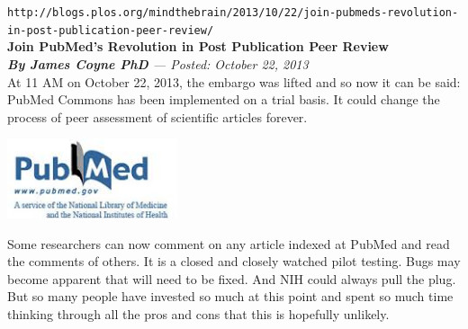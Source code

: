 \documentclass[11pt,twoside,a4paper]{article}
\def\maketitle{%
	\begin{center}
		\begin{tabular}[c]{c|c}
			\textsc{\textbf{Institution}}~\\[\baselineskip]~\\[\baselineskip]
			\emph{\textbf{Date 09-09-2009}}~\\[\baselineskip]~\\[\baselineskip]
			\emph{\textbf{Pr{\'e}cisions relatives au contexte}}~\\[\baselineskip]~\\[\baselineskip]
			\textsc{Auteur inestimable}~\\[\baselineskip]~\\[\baselineskip]
			& 
			\texttt{[image: img/logo\_glider.png]}~\\[\baselineskip]
		\end{tabular}
			~\\[\baselineskip]~\\[\baselineskip]
			\Huge{Titre principal}~\\[\baselineskip]
			\Large{Titre secondaire}~\\[\baselineskip]
		
		~\\[\baselineskip]
		~\\[\baselineskip]
	\large{
		\textsc{\textbf{Institution d'accueil et jury}}
		~\\[\baselineskip]
		<<titre personne>> : \texttt{Anne ONYME}~\\[\baselineskip]
		<<titre personne>> : \texttt{Jocelyn CONNU}~\\[\baselineskip]
		~\\[\baselineskip]
		\textit{Pr{\'e}cisions du contexte de r{\'e}daction de l'article}
	}

	\end{center}

}%
\begin{document}

\setcounter{page}{1}

\setlength\parindent{0pt}

\texttt{http://blogs.plos.org/mindthebrain/2013/10/22/join-pubmeds-revolution-in-post-publication-peer-review/} ~\\

\textbf{\Large Join PubMed's Revolution in Post Publication Peer Review} ~\\

\emph{\textbf{By James Coyne PhD} --- Posted: October 22, 2013} ~\\

At 11 AM on October 22, 2013, the embargo was lifted and so now it can be said: PubMed Commons has been implemented on a trial basis. It could change the process of peer assessment of scientific articles forever. ~\\

\begin{minipage}[h]{5.25cm}
	\includegraphics[width=5.00cm]{img/PubMed.jpg}
\end{minipage} \hfill \begin{minipage}[h]{13.75cm}
	Some researchers can now comment on any article indexed at PubMed and read the comments of others. It is a closed and closely watched pilot testing. Bugs may become apparent that will need to be fixed. And NIH could always pull the plug. But so many people have invested so much at this point and spent so much time thinking through all the pros and cons that this is hopefully unlikely. ~\\
\end{minipage}
\end{document}
